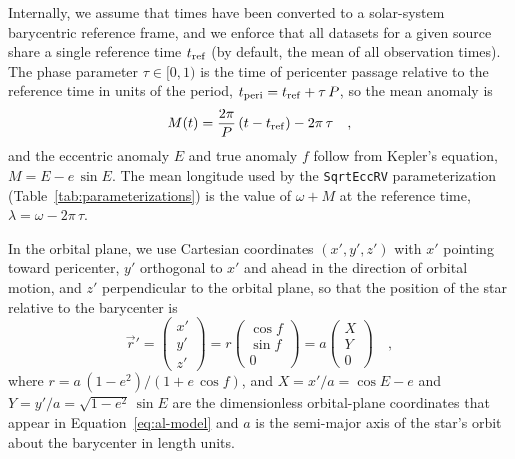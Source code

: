 \documentclass[twocolumn]{AASTeX7/aastex701}
\begin{document}
Internally, we assume that times have been converted to a solar-system barycentric
reference frame, and we enforce that all datasets for a given source share a single
reference time $t_{\rm ref}$ (by default, the mean of all observation times).
The phase parameter $\tau \in [0, 1)$ is
the time of pericenter passage relative to the reference time in units of the period,
$t_{\rm peri} = t_{\rm ref} + \tau\,P$, so the mean anomaly is
\begin{equation}
  M(t) = \frac{2\pi}{P}\,(t - t_{\rm ref}) - 2\pi\,\tau
  \quad ,
\end{equation}
and the eccentric anomaly $E$ and true anomaly $f$ follow from Kepler's equation, $M = E
- e\,\sin E$.
The mean longitude used by the \texttt{SqrtEccRV} parameterization
(Table~\ref{tab:parameterizations}) is the value of $\omega + M$ at the reference time,
$\lambda = \omega - 2\pi\,\tau$.

In the orbital plane, we use Cartesian coordinates $(x', y', z')$ with $x'$ pointing
toward pericenter, $y'$ orthogonal to $x'$ and ahead in the direction of orbital
motion, and $z'$ perpendicular to the orbital plane, so that the position of the star
relative to the barycenter is
\begin{equation}
  \vec{r}' =
  \begin{pmatrix} x' \\ y' \\ z' \end{pmatrix} =
  r \begin{pmatrix} \cos f \\ \sin f \\ 0 \end{pmatrix} =
  a \begin{pmatrix} X \\ Y \\ 0 \end{pmatrix}
  \quad ,
  \label{eq:conv-orbit}
\end{equation}
where $r = a\,(1 - e^2) / (1 + e\,\cos f)$, and $X = x'/a = \cos E - e$ and $Y = y'/a =
\sqrt{1 - e^2}\,\sin E$ are the dimensionless orbital-plane coordinates that appear in
Equation~\ref{eq:al-model} and $a$ is the semi-major axis of the star's orbit about the
barycenter in length units.
\end{document}

